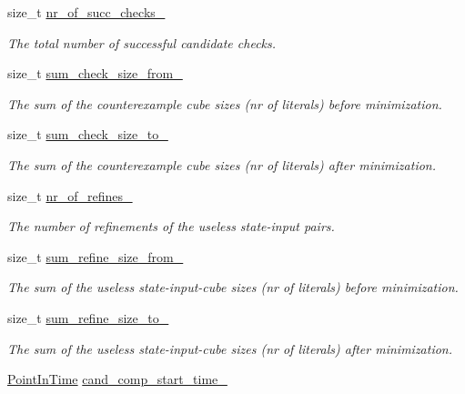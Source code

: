 \begin{DoxyCompactItemize}
size\-\_\-t \hyperlink{classLearnStatisticsSAT_aa059a13f6afcf98a04be072aa5ce3f1d}{nr\-\_\-of\-\_\-succ\-\_\-checks\-\_\-}
\begin{DoxyCompactList}\small\item\em The total number of successful candidate checks. \end{DoxyCompactList}\item 
size\-\_\-t \hyperlink{classLearnStatisticsSAT_a2d6735aa7c84c50967b3bb779d2a0a86}{sum\-\_\-check\-\_\-size\-\_\-from\-\_\-}
\begin{DoxyCompactList}\small\item\em The sum of the counterexample cube sizes (nr of literals) before minimization. \end{DoxyCompactList}\item 
size\-\_\-t \hyperlink{classLearnStatisticsSAT_ae805d5a2fc2f724d325136a9f30e6b4b}{sum\-\_\-check\-\_\-size\-\_\-to\-\_\-}
\begin{DoxyCompactList}\small\item\em The sum of the counterexample cube sizes (nr of literals) after minimization. \end{DoxyCompactList}\item 
size\-\_\-t \hyperlink{classLearnStatisticsSAT_afa9b3c4bb24e7f6ebd9593dfb916c11e}{nr\-\_\-of\-\_\-refines\-\_\-}
\begin{DoxyCompactList}\small\item\em The number of refinements of the useless state-\/input pairs. \end{DoxyCompactList}\item 
size\-\_\-t \hyperlink{classLearnStatisticsSAT_a7f36ead437ee4833c96342d812551cce}{sum\-\_\-refine\-\_\-size\-\_\-from\-\_\-}
\begin{DoxyCompactList}\small\item\em The sum of the useless state-\/input-\/cube sizes (nr of literals) before minimization. \end{DoxyCompactList}\item 
size\-\_\-t \hyperlink{classLearnStatisticsSAT_ab64cce193c819cdd5c3a6838d99eb0a7}{sum\-\_\-refine\-\_\-size\-\_\-to\-\_\-}
\begin{DoxyCompactList}\small\item\em The sum of the useless state-\/input-\/cube sizes (nr of literals) after minimization. \end{DoxyCompactList}\item 
\hyperlink{Options_8h_af3a9f634f27bed7e98dbc23e5c6f807d}{Point\-In\-Time} \hyperlink{classLearnStatisticsSAT_a73f2f0e2ee619df05b22261e7b691320}{cand\-\_\-comp\-\_\-start\-\_\-time\-\_\-}

\end{DoxyCompactItemize}

